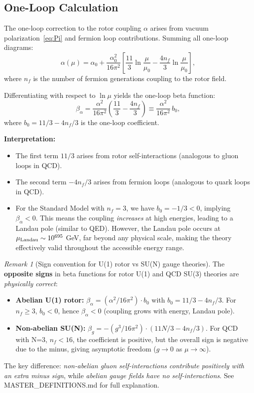 \documentclass[11pt,a4paper]{article}
\numberwithin{equation}{section}
\theoremstyle{plain}
\theoremstyle{definition}
\theoremstyle{remark}
\newtheorem{remark}[theorem]{Remark}
\begin{document}
\subsection{One-Loop Calculation}

The one-loop correction to the rotor coupling $\alpha$ arises from vacuum polarization~\eqref{eq:Pi} and fermion loop contributions. Summing all one-loop diagrams:
\begin{equation}
\alpha(\mu) = \alpha_0 + \frac{\alpha_0^2}{16\pi^2}\left[\frac{11}{3}\ln\frac{\mu}{\mu_0} - \frac{4n_f}{3}\ln\frac{\mu}{\mu_0}\right],
\label{eq:alpha-1loop}
\end{equation}
where $n_f$ is the number of fermion generations coupling to the rotor field.

Differentiating with respect to $\ln\mu$ yields the one-loop beta function:
\begin{equation}
\beta_\alpha = \frac{\alpha^2}{16\pi^2}\left(\frac{11}{3} - \frac{4n_f}{3}\right) \equiv \frac{\alpha^2}{16\pi^2}\,b_0,
\label{eq:beta-alpha-1loop-final}
\end{equation}
where $b_0 = 11/3 - 4n_f/3$ is the one-loop coefficient.

\textbf{Interpretation:}
\begin{itemize}
  \item The first term $11/3$ arises from rotor self-interactions (analogous to gluon loops in QCD).
  \item The second term $-4n_f/3$ arises from fermion loops (analogous to quark loops in QCD).
  \item For the Standard Model with $n_f=3$, we have $b_0 = -1/3 < 0$, implying $\beta_\alpha < 0$. This means the coupling \emph{increases} at high energies, leading to a Landau pole (similar to QED). However, the Landau pole occurs at $\mu_{\rm Landau} \sim 10^{695}$ GeV, far beyond any physical scale, making the theory effectively valid throughout the accessible energy range.
\end{itemize}

\begin{remark}[Sign convention for U(1) rotor vs SU(N) gauge theories]
The \textbf{opposite signs} in beta functions for rotor U(1) and QCD SU(3) theories are \emph{physically correct}:
\begin{itemize}
  \item \textbf{Abelian U(1) rotor:} $\beta_\alpha = (\alpha^2/16\pi^2) \cdot b_0$ with $b_0 = 11/3 - 4n_f/3$. For $n_f \geq 3$, $b_0 < 0$, hence $\beta_\alpha < 0$ (coupling grows with energy, Landau pole).
  \item \textbf{Non-abelian SU(N):} $\beta_g = -(g^3/16\pi^2) \cdot (11N/3 - 4n_f/3)$. For QCD with N=3, $n_f < 16$, the coefficient is positive, but the overall sign is negative due to the minus, giving asymptotic freedom ($g \to 0$ as $\mu \to \infty$).
\end{itemize}
The key difference: \emph{non-abelian gluon self-interactions contribute positively with an extra minus sign}, while \emph{abelian gauge fields have no self-interactions}. See MASTER\_DEFINITIONS.md for full explanation.
\end{remark}
\end{document}
